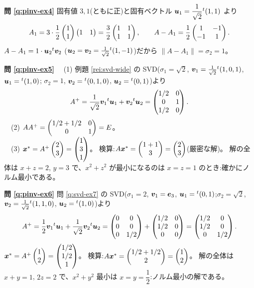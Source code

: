 \bigskip
\noindent\textbf{問 \ref{q:pinv-ex4}}\quad
固有値 $3, 1$(ともに正)と固有ベクトル
$\bm{u}_1 = \dfrac{1}{\sqrt{2}}{}^t(1, 1)$ より
\[
A_1 = 3 \cdot \frac{1}{2}\begin{pmatrix}1 \\ 1\end{pmatrix}\begin{pmatrix}1 & 1\end{pmatrix}
= \frac{3}{2}\begin{pmatrix}1 & 1 \\ 1 & 1\end{pmatrix}, \qquad
A - A_1 = \frac{1}{2}\begin{pmatrix}1 & -1 \\ -1 & 1\end{pmatrix}.
\]
$A - A_1 = 1 \cdot \bm{u}_2{}^t\bm{v}_2$
($\bm{u}_2 = \bm{v}_2 = \frac{1}{\sqrt{2}}{}^t(1, -1)$)だから
$\|A - A_1\| = \sigma_2 = 1$。

\bigskip
\noindent\textbf{問 \ref{q:pinv-ex5}}\quad
　(1) 例題 \ref{rei:svd-wide} の SVD($\sigma_1 = \sqrt{2}$,
$\bm{v}_1 = \frac{1}{\sqrt{2}}{}^t(1,0,1)$, $\bm{u}_1 = {}^t(1,0)$;
$\sigma_2 = 1$, $\bm{v}_2 = {}^t(0,1,0)$, $\bm{u}_2 = {}^t(0,1)$)より
\[
A^{+} = \frac{1}{\sqrt{2}}\bm{v}_1{}^t\bm{u}_1
+ \bm{v}_2{}^t\bm{u}_2
= \begin{pmatrix}1/2 & 0 \\ 0 & 1 \\ 1/2 & 0\end{pmatrix}.
\]
　(2) $AA^{+} = \begin{pmatrix}1/2 + 1/2 & 0 \\ 0 & 1\end{pmatrix} = E$。\\
　(3) $\bm{x}^* = A^{+}\begin{pmatrix}2 \\ 3\end{pmatrix} = \begin{pmatrix}1 \\ 3 \\ 1\end{pmatrix}$。
検算:$A\bm{x}^* = \begin{pmatrix}1 + 1 \\ 3\end{pmatrix} = \begin{pmatrix}2 \\ 3\end{pmatrix}$(厳密な解)。
解の全体は $x + z = 2$, $y = 3$ で、$x^2 + z^2$ が最小になるのは
$x = z = 1$ のとき:確かにノルム最小である。

\bigskip
\noindent\textbf{問 \ref{q:pinv-ex6}}\quad
問 \ref{q:svd-ex7} の SVD($\sigma_1 = 2$, $\bm{v}_1 = \bm{e}_3$,
$\bm{u}_1 = {}^t(0,1)$;$\sigma_2 = \sqrt{2}$,
$\bm{v}_2 = \frac{1}{\sqrt{2}}{}^t(1,1,0)$, $\bm{u}_2 = {}^t(1,0)$)より
\[
A^{+} = \frac{1}{2}\bm{v}_1{}^t\bm{u}_1
+ \frac{1}{\sqrt{2}}\bm{v}_2{}^t\bm{u}_2
= \begin{pmatrix}0 & 0 \\ 0 & 0 \\ 0 & 1/2\end{pmatrix} + \begin{pmatrix}1/2 & 0 \\ 1/2 & 0 \\ 0 & 0\end{pmatrix}
= \begin{pmatrix}1/2 & 0 \\ 1/2 & 0 \\ 0 & 1/2\end{pmatrix}.
\]
$\bm{x}^* = A^{+}\begin{pmatrix}1 \\ 2\end{pmatrix} = \begin{pmatrix}1/2 \\ 1/2 \\ 1\end{pmatrix}$。
検算:$A\bm{x}^* = \begin{pmatrix}1/2 + 1/2 \\ 2\end{pmatrix} = \begin{pmatrix}1 \\ 2\end{pmatrix}$。
解の全体は $x + y = 1$, $2z = 2$ で、$x^2 + y^2$ 最小は
$x = y = \dfrac{1}{2}$:ノルム最小の解である。


